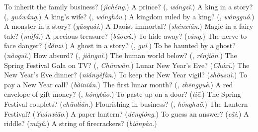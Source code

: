 \begin{tcolorbox}[breakable,colback=teal!4,colframe=teal!35!black,title={Before you move on}]
To inherit the family business? (\emph{jìchéng}.) A prince? (\textbf{}, \emph{wángzǐ}.) A king in a story? (\textbf{}, \emph{guówáng}.) A king's wife? (\textbf{}, \emph{wánghòu}.) A kingdom ruled by a king? (\textbf{}, \emph{wángguó}.) A monster in a story? (\emph{yāoguài}.) A Daoist immortal? (\emph{shénxiān}.) Magic in a fairy tale? (\emph{mófǎ}.) A precious treasure? (\emph{bǎowù}.) To hide away? (\emph{cáng}.) The nerve to face danger? (\emph{dǎnzi}.) A ghost in a story? (\textbf{}, \emph{guǐ}.) To be haunted by a ghost? (\emph{nàoguǐ}.) How absurd? (\textbf{}, \emph{jiànguǐ}.) The human world below? (\textbf{}, \emph{rénjiān}.) The Spring Festival Gala on TV? (\textbf{}, \emph{Chūnwǎn}.) Lunar New Year's Eve? (\emph{Chúxī}.) The New Year's Eve dinner? (\emph{niányèfàn}.) To keep the New Year vigil? (\emph{shǒusuì}.) To pay a New Year call? (\emph{bàinián}.) The first lunar month? (\textbf{}, \emph{zhēngyuè}.) A red envelope of gift money? (\textbf{}, \emph{hóngbāo}.) To paste up on a door? (\emph{tiē}.) The Spring Festival couplets? (\emph{chūnlián}.) Flourishing in business? (\textbf{}, \emph{hónghuǒ}.) The Lantern Festival? (\emph{Yuánxiāo}.) A paper lantern? (\emph{dēnglóng}.) To guess an answer? (\emph{cāi}.) A riddle? (\emph{míyǔ}.) A string of firecrackers? (\emph{biānpào}.)
\end{tcolorbox}
